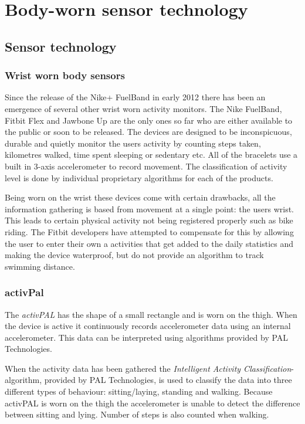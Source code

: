 \chapter{Body-worn sensor technology}

\section{Sensor technology}

\subsection{Wrist worn body sensors}
Since the release of the Nike+ FuelBand in early 2012 there has been an emergence of several other wrist worn activity monitors. The Nike FuelBand, Fitbit Flex and Jawbone Up are the only ones so far who are either available to the public or soon to be released. The devices are designed to be inconspicuous, durable and quietly monitor the users activity by counting steps taken, kilometres walked, time spent sleeping or sedentary etc. All of the bracelets use a built in 3-axis accelerometer to record movement. The classification of activity level is done by individual proprietary algorithms for each of the products. 

Being worn on the wrist these devices come with certain drawbacks, all the information gathering is based from movement at a single point: the users wrist. This leads to certain physical activity not being registered properly such as bike riding. The Fitbit developers have attempted to compensate for this by allowing the user to enter their own a activities that get added to the daily statistics and making the device waterproof, but do not provide an algorithm to track swimming distance.

\subsection{activPal}
The \emph{activPAL} has the shape of a small rectangle and is worn on the thigh. When the device is active it continuously records accelerometer data using an internal accelerometer. This data can be interpreted using algorithms provided by PAL Technologies.

When the activity data has been gathered the \emph{Intelligent Activity Classification}-algorithm, provided by PAL Technologies, is used to classify the data into three different types of behaviour: sitting/laying, standing and walking. Because activPAL is worn on the thigh the accelerometer is unable to detect the difference between sitting and lying. Number of steps is also counted when walking.

